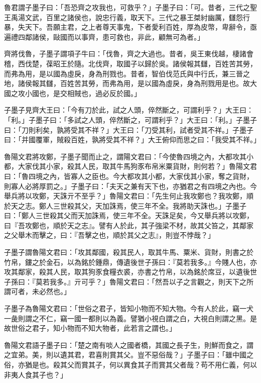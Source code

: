
\begin{pinyinscope}
魯君謂子墨子曰：「吾恐齊之攻我也，可救乎？」子墨子曰：「可。昔者，三代之聖王禹湯文武，百里之諸侯也，說忠行義，取天下。三代之暴王桀紂幽厲，讎怨行暴，失天下。吾願主君，之上者尊天事鬼，下者愛利百姓，厚為皮幣，卑辭令，亟遍禮四鄰諸侯，敺國而以事齊，患可救也，非此，顧無可為者。」

齊將伐魯，子墨子謂項子牛曰：「伐魯，齊之大過也。昔者，吳王東伐越，棲諸會稽，西伐楚，葆昭王於隨。北伐齊，取國子以歸於吳。諸侯報其讎，百姓苦其勞，而弗為用，是以國為虛戾，身為刑戮也。昔者，智伯伐范氏與中行氏，兼三晉之地，諸侯報其讎，百姓苦其勞，而弗為用，是以國為虛戾，身為刑戮用是也。故大國之攻小國也，是交相賊也，過必反於國。」

子墨子見齊大王曰：「今有刀於此，試之人頭，倅然斷之，可謂利乎？」大王曰：「利。」子墨子曰：「多試之人頭，倅然斷之，可謂利乎？」大王曰：「利。」子墨子曰：「刀則利矣，孰將受其不祥？」大王曰：「刀受其利，試者受其不祥。」子墨子曰：「并國覆軍，賊殺百姓，孰將受其不祥？」大王俯仰而思之曰：「我受其不祥。」

魯陽文君將攻鄭，子墨子聞而止之，謂陽文君曰：「今使魯四境之內，大都攻其小都，大家伐其小家，殺其人民，取其牛馬狗豕布帛米粟貨財，則何若？」魯陽文君曰：「魯四境之內，皆寡人之臣也。今大都攻其小都，大家伐其小家，奪之貨財，則寡人必將厚罰之。」子墨子曰：「夫天之兼有天下也，亦猶君之有四境之內也。今舉兵將以攻鄭，天誅亓不至乎？」魯陽文君曰：「先生何止我攻鄭也？我攻鄭，順於天之志。鄭人三世殺其父，天加誅焉，使三年不全。我將助天誅也。」子墨子曰：「鄭人三世殺其父而天加誅焉，使三年不全。天誅足矣，今又舉兵將以攻鄭，曰『吾攻鄭也，順於天之志』。譬有人於此，其子強梁不材，故其父笞之，其鄰家之父舉木而擊之，曰：『吾擊之也，順於其父之志』，則豈不悖哉？」

子墨子謂魯陽文君曰：「攻其鄰國，殺其民人，取其牛馬、粟米、貨財，則書之於竹帛，鏤之於金石，以為銘於鍾鼎，傳遺後世子孫曰：『莫若我多。』今賤人也，亦攻其鄰家，殺其人民，取其狗豕食糧衣裘，亦書之竹帛，以為銘於席豆，以遺後世子孫曰：『莫若我多。』亓可乎？」魯陽文君曰：「然吾以子之言觀之，則天下之所謂可者，未必然也。」

子墨子為魯陽文君曰：「世俗之君子，皆知小物而不知大物。今有人於此，竊一犬一彘則謂之不仁，竊一國一都則以為義。譬猶小視白謂之白，大視白則謂之黑。是故世俗之君子，知小物而不知大物者，此若言之謂也。」

魯陽文君語子墨子曰：「楚之南有啖人之國者橋，其國之長子生，則鮮而食之，謂之宜弟。美，則以遺其君，君喜則賞其父。豈不惡俗哉？」子墨子曰：「雖中國之俗，亦猶是也。殺其父而賞其子，何以異食其子而賞其父者哉？苟不用仁義，何以非夷人食其子也？」


\end{pinyinscope}
